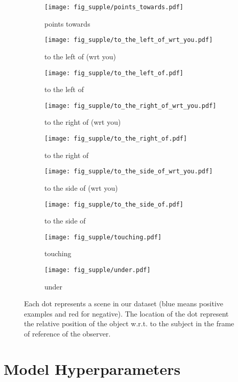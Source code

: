 \documentclass{article}
\begin{document}
\clearpage
\begin{figure}
\centering
\ContinuedFloat
\begin{subfigure}{0.22\linewidth}
\texttt{[image: fig\_supple/points\_towards.pdf]}
\caption{points towards}
\end{subfigure}
\begin{subfigure}{0.22\linewidth}
\texttt{[image: fig\_supple/to\_the\_left\_of\_wrt\_you.pdf]}
\caption{to the left of (wrt you)}
\end{subfigure}
\begin{subfigure}{0.22\linewidth}
\texttt{[image: fig\_supple/to\_the\_left\_of.pdf]}
\caption{to the left of}
\end{subfigure}
\begin{subfigure}{0.22\linewidth}
\texttt{[image: fig\_supple/to\_the\_right\_of\_wrt\_you.pdf]}
\caption{to the right of (wrt you)}
\end{subfigure}
\begin{subfigure}{0.22\linewidth}
\texttt{[image: fig\_supple/to\_the\_right\_of.pdf]}
\caption{to the right of}
\end{subfigure}
\begin{subfigure}{0.22\linewidth}
\texttt{[image: fig\_supple/to\_the\_side\_of\_wrt\_you.pdf]}
\caption{to the side of (wrt you)}
\end{subfigure}
\begin{subfigure}{0.22\linewidth}
\texttt{[image: fig\_supple/to\_the\_side\_of.pdf]}
\caption{to the side of}
\end{subfigure}
\begin{subfigure}{0.22\linewidth}
\texttt{[image: fig\_supple/touching.pdf]}
\caption{touching}
\end{subfigure}
\begin{subfigure}{0.22\linewidth}
\texttt{[image: fig\_supple/under.pdf]}
\caption{under}
\end{subfigure}

\caption{Each dot represents a scene in our dataset (blue means positive examples and red for negative). The location of the dot represent the relative position of the object w.r.t. to the subject in the frame of reference of the observer.}
\vspace{-.5cm}
\end{figure}

\clearpage
\section{Model Hyperparameters}
\end{document}
